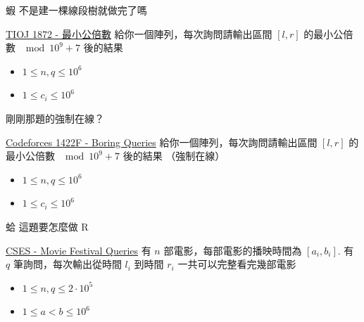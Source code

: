 \documentclass[aspectratio=169]{beamer}
\begin{document}
    \begin{frame}{蝦 不是建一棵線段樹就做完了嗎}
        \begin{block}{\href{https://tioj.ck.tp.edu.tw/problems/1872}{TIOJ 1872 - 最小公倍數}}
            給你一個陣列，每次詢問請輸出區間 $[l,r]$ 的最小公倍數 $\mod 10^9+7$ 後的結果\\
            \vspace{0.5cm}
            \begin{itemize}
                \item $1 \le n,q \le 10^6$
                \item $1 \le c_i \le 10^6$
            \end{itemize}
        \end{block}
    \end{frame}

    \begin{frame}{剛剛那題的強制在線？}
        \begin{block}{\href{https://codeforces.com/problemset/problem/1422/F}{Codeforces 1422F - Boring Queries}}
            給你一個陣列，每次詢問請輸出區間 $[l,r]$ 的最小公倍數 $\mod 10^9+7$ 後的結果 （強制在線）\\
            \vspace{0.5cm}
            \begin{itemize}
                \item $1 \le n,q \le 10^6$
                \item $1 \le c_i \le 10^6$
            \end{itemize}
        \end{block}
    \end{frame}

    \begin{frame}{蛤 這題要怎麼做 R}
        \begin{block}{\href{https://cses.fi/problemset/task/1664}{CSES - Movie Festival Queries}}
            有 $n$ 部電影，每部電影的播映時間為 $[a_i,b_i]$. 有 $q$ 筆詢問，每次輸出從時間 $l_i$ 到時間 $r_i$ 一共可以完整看完幾部電影\\
            \vspace{0.5cm}
            \begin{itemize}
                \item $1 \le n,q \le 2 \cdot 10^5$
                \item $1 \le a < b \le 10^6$
            \end{itemize}
        \end{block}
    \end{frame}
\end{document}
